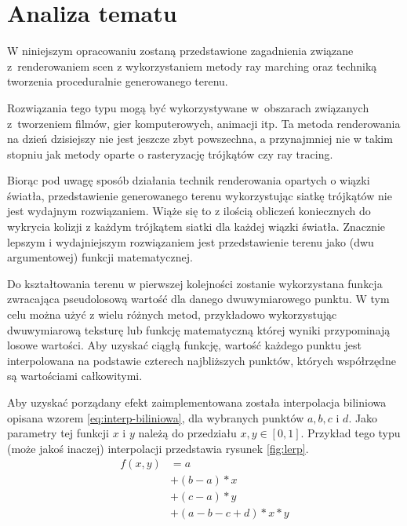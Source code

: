 \chapter{Analiza tematu}

W niniejszym opracowaniu zostaną przedstawione zagadnienia związane z~renderowaniem scen z wykorzystaniem metody ray marching oraz techniką tworzenia proceduralnie generowanego terenu.

Rozwiązania tego typu mogą być wykorzystywane w~obszarach związanych z~tworzeniem filmów, gier komputerowych, animacji itp. Ta metoda renderowania na dzień dzisiejszy nie jest jeszcze zbyt powszechna, a przynajmniej nie w takim stopniu jak metody oparte o rasteryzację trójkątów czy ray tracing.

Biorąc pod uwagę sposób działania technik renderowania opartych o wiązki światła, przedstawienie generowanego terenu wykorzystując siatkę trójkątów nie jest wydajnym rozwiązaniem. Wiąże się to z ilością obliczeń koniecznych do wykrycia kolizji z każdym trójkątem siatki dla każdej wiązki światła. Znacznie lepszym  i wydajniejszym rozwiązaniem jest przedstawienie terenu jako (dwu argumentowej) funkcji matematycznej.

Do kształtowania terenu w pierwszej kolejności zostanie wykorzystana funkcja zwracająca pseudolosową wartość dla danego dwuwymiarowego punktu.
W tym celu można użyć z wielu różnych metod, przykładowo wykorzystując dwuwymiarową teksturę
lub funkcję matematyczną której wyniki przypominają losowe wartości. Aby uzyskać ciągłą funkcję, wartość każdego punktu jest interpolowana na podstawie czterech najbliższych punktów, których współrzędne są wartościami całkowitymi.

Aby uzyskać porządany efekt zaimplementowana została interpolacja biliniowa opisana wzorem \ref{eq:interp-biliniowa}, dla wybranych punktów $a, b, c$ i $d$. Jako parametry tej funkcji $x$ i $y$ należą do przedziału $x, y \in [0, 1]$. Przykład tego typu (może jakoś inaczej) interpolacji przedstawia rysunek \ref{fig:lerp}.
\begin{equation}
\label{eq:interp-biliniowa}
  \begin{split}
    f(x, y) & = a \\
       & + (b - a) * x \\
       & + (c - a) * y \\
       & + (a - b - c + d) * x * y
    \end{split}
\end{equation}

